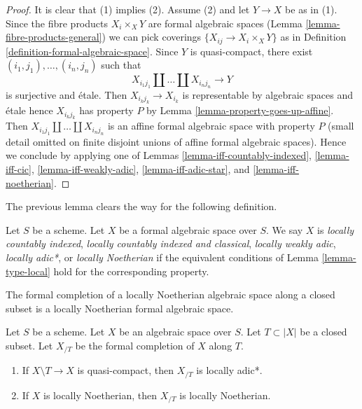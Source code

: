 \begin{proof}
It is clear that (1) implies (2). Assume (2) and let
$Y \to X$ be as in (1). Since the fibre products $X_i \times_X Y$
are formal algebraic spaces (Lemma \ref{lemma-fibre-products-general})
we can pick coverings $\{X_{ij} \to X_i \times_X Y\}$ as in
Definition \ref{definition-formal-algebraic-space}.
Since $Y$ is quasi-compact, there exist
$(i_1, j_1), \ldots, (i_n, j_n)$ such that
$$
X_{i_1 j_1} \amalg \ldots \amalg X_{i_n j_n} \longrightarrow Y
$$
is surjective and \'etale. Then $X_{i_kj_k} \to X_{i_k}$ is representable
by algebraic spaces and \'etale hence $X_{i_kj_k}$ has property $P$ by
Lemma \ref{lemma-property-goes-up-affine}.
Then $X_{i_1 j_1} \amalg \ldots \amalg X_{i_n j_n}$ is an
affine formal algebraic space with property $P$ (small detail
omitted on finite disjoint unions of affine formal algebraic spaces).
Hence we conclude by applying one of
Lemmas \ref{lemma-iff-countably-indexed},
\ref{lemma-iff-cic},
\ref{lemma-iff-weakly-adic},
\ref{lemma-iff-adic-star}, and
\ref{lemma-iff-noetherian}.
\end{proof}

\noindent
The previous lemma clears the way for the following definition.

\begin{definition}
\label{definition-types-formal-algebraic-spaces}
Let $S$ be a scheme. Let $X$ be a formal algebraic space over $S$.
We say $X$ is
{\it locally countably indexed},
{\it locally countably indexed and classical},
{\it locally weakly adic},
{\it locally adic*}, or
{\it locally Noetherian}
if the equivalent conditions of Lemma \ref{lemma-type-local}
hold for the corresponding property.
\end{definition}

\noindent
The formal completion of a locally Noetherian algebraic space
along a closed subset is a locally Noetherian formal algebraic space.

\begin{lemma}
\label{lemma-formal-completion-types}
Let $S$ be a scheme. Let $X$ be an algebraic space over $S$.
Let $T \subset |X|$ be a closed subset. Let $X_{/T}$ be the
formal completion of $X$ along $T$.
\begin{enumerate}
\item If $X \setminus T \to X$ is quasi-compact,
then $X_{/T}$ is locally adic*.
\item If $X$ is locally Noetherian, then $X_{/T}$ is locally
Noetherian.
\end{enumerate}
\end{lemma}

